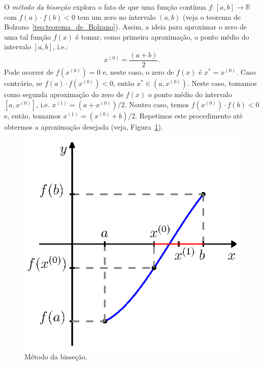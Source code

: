 O \emph{método da bisseção} explora o fato de que uma função contínua $f:[a, b]\to \mathbb{R}$ com $f(a)\cdot f(b) < 0$ tem um zero no intervalo $(a, b)$ (veja o teorema de Bolzano~\ref{teo:teorema_de_Bolzano}). Assim, a ideia para aproximar o zero de uma tal função $f(x)$ é tomar, como primeira aproximação, o ponto médio do intervalo $[a, b]$, i.e.:
\begin{equation*}
  x^{(0)} = \frac{(a + b)}{2}. 
\end{equation*}
Pode ocorrer de $f(x^{(0)}) = 0$ e, neste caso, o zero de $f(x)$ é $x^* = x^{(0)}$. Caso contrário, se $f(a)\cdot f(x^{(0)}) < 0$, então $x^*\in (a, x^{(0)})$. Neste caso, tomamos como segunda aproximação do zero de $f(x)$ o ponto médio do intervalo $[a, x^{(0)}]$, i.e. $x^{(1)} = (a + x^{(0)})/2$. Noutro caso, temos $f(x^{(0)})\cdot f(b) < 0$ e, então, tomamos $x^{(1)} = (x^{(0)} + b)/2$. Repetimos este procedimento até obtermos a aproximação desejada (veja, Figura~\ref{fig:metodo_da_bissecao}).
 
\begin{figure}
  \centering
  \includegraphics{./cap_equacao1d/pics/metodo_da_bissecao/metodo_da_bissecao.eps}
  \caption{Método da bisseção.}
  \label{fig:metodo_da_bissecao}
\end{figure}

